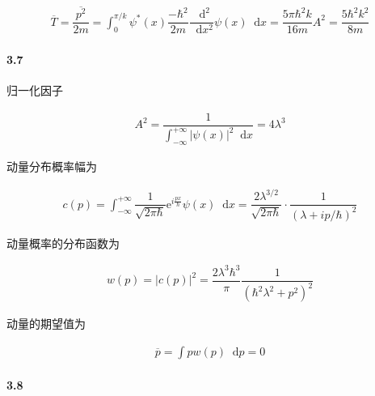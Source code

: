 \documentclass{article}
\newcommand*{\md}{\mathop{}\!\mathrm{d}}
\newcommand*{\me}{\mathrm{e}}
\begin{document}
\begin{equation*}
  \begin{aligned}
    \overline{T} = \overline{\dfrac{p^2}{2m} } =
    \int_0^{\pi/k} \psi^{*} \left( x \right) \dfrac{- \hbar^2}{2m} \dfrac{\md^2}{\md x^2} \psi \left( x \right) \md x = \dfrac{5\pi \hbar^2 k}{16m} A^2 = \dfrac{5 \hbar^2 k^2}{8m}    
  \end{aligned}
\end{equation*}

\paragraph{3.7}

归一化因子

\begin{equation*}
  \begin{aligned}
    A^2 = \dfrac{1}{\int_{-\infty}^{+\infty} \left| \psi \left( x \right) \right|^2 \md x}
    = 4\lambda^3
  \end{aligned}
\end{equation*}

动量分布概率幅为

\begin{equation*}
  \begin{aligned}
    c \left( p \right)
    = \int_{-\infty}^{+\infty} \dfrac{1}{\sqrt{2\pi \hbar}} \me^{i \frac{px}{\hbar} } \psi \left( x \right) \md x
    = \dfrac{2 \lambda^{3/2}}{\sqrt{2\pi \hbar}} \cdot \dfrac{1}{\left( \lambda + ip/\hbar \right)^2}  
  \end{aligned}
\end{equation*}

动量概率的分布函数为

\begin{equation*}
  \begin{aligned}
    w \left( p \right) = \left| c \left( p \right) \right|^2 = \dfrac{2 \lambda^3 \hbar^3}{\pi} \dfrac{1}{\left( \hbar^2 \lambda^2 + p^2 \right)^2}  
  \end{aligned}
\end{equation*}

动量的期望值为

\begin{equation*}
  \begin{aligned}
    \overline{p} = \int p w \left( p \right) \md p = 0
  \end{aligned}
\end{equation*}

\paragraph{3.8}
\end{document}
